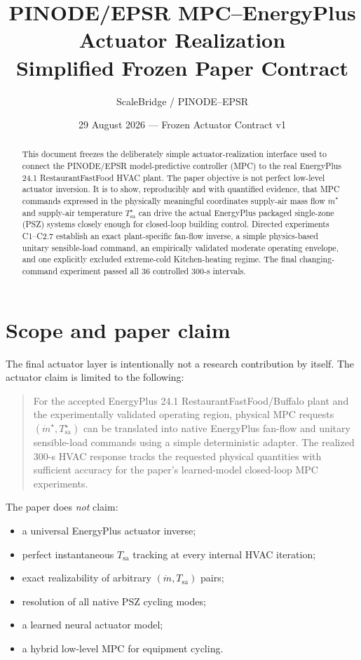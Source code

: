 \documentclass[11pt]{article}
\title{PINODE/EPSR MPC--EnergyPlus Actuator Realization\\
Simplified Frozen Paper Contract}
\author{ScaleBridge / PINODE--EPSR}
\date{29 August 2026 --- Frozen Actuator Contract v1}
\newcommand{\mdot}{\dot m}
\newcommand{\Tsa}{T_{\mathrm{sa}}}
\begin{document}
\maketitle

\begin{abstract}
This document freezes the deliberately simple actuator-realization interface
used to connect the PINODE/EPSR model-predictive controller (MPC) to the real
EnergyPlus 24.1 RestaurantFastFood HVAC plant.  The paper objective is not
perfect low-level actuator inversion.  It is to show, reproducibly and with
quantified evidence, that MPC commands expressed in the physically meaningful
coordinates supply-air mass flow $\mdot^\star$ and supply-air temperature
$\Tsa^\star$ can drive the actual EnergyPlus packaged single-zone (PSZ)
systems closely enough for closed-loop building control.  Directed experiments
C1--C2.7 establish an exact plant-specific fan-flow inverse, a simple
physics-based unitary sensible-load command, an empirically validated moderate
operating envelope, and one explicitly excluded extreme-cold Kitchen-heating
regime.  The final changing-command experiment passed all 36 controlled
300-s intervals.
\end{abstract}

\section{Scope and paper claim}

The final actuator layer is intentionally not a research contribution by
itself.  The actuator claim is limited to the following:

\begin{quote}
For the accepted EnergyPlus 24.1 RestaurantFastFood/Buffalo plant and the
experimentally validated operating region, physical MPC requests
$(\mdot^\star,\Tsa^\star)$ can be translated into native EnergyPlus fan-flow
and unitary sensible-load commands using a simple deterministic adapter.  The
realized 300-s HVAC response tracks the requested physical quantities with
sufficient accuracy for the paper's learned-model closed-loop MPC experiments.
\end{quote}

The paper does \emph{not} claim:
\begin{itemize}[leftmargin=2em]
\item a universal EnergyPlus actuator inverse;
\item perfect instantaneous $\Tsa$ tracking at every internal HVAC iteration;
\item exact realizability of arbitrary $(\mdot,\Tsa)$ pairs;
\item resolution of all native PSZ cycling modes;
\item a learned neural actuator model;
\item a hybrid low-level MPC for equipment cycling.
\end{itemize}
\end{document}
